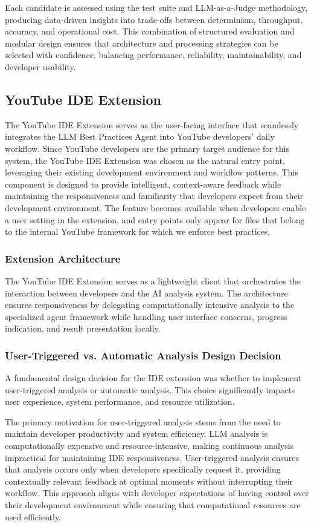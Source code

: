 \begin{spacing}{1.2}
Each candidate is assessed using the test suite and LLM-as-a-Judge methodology, producing data-driven insights into trade-offs between determinism, throughput, accuracy, and operational cost.
This combination of structured evaluation and modular design ensures that architecture and processing strategies can be selected with confidence, balancing performance, reliability, maintainability, and developer usability.


\subsection{YouTube IDE Extension}
The YouTube IDE Extension serves as the user-facing interface that seamlessly integrates the LLM Best Practices Agent into YouTube developers' daily workflow. Since YouTube developers are the primary target audience for this system, the YouTube IDE Extension was chosen as the natural entry point, leveraging their existing development environment and workflow patterns. This component is designed to provide intelligent, context-aware feedback while maintaining the responsiveness and familiarity that developers expect from their development environment. The feature becomes available when developers enable a user setting in the extension, and entry points only appear for files that belong to the internal YouTube framework for which we enforce best practices.

\subsubsection{Extension Architecture}
The YouTube IDE Extension serves as a lightweight client that orchestrates the interaction between developers and the AI analysis system. The architecture ensures responsiveness by delegating computationally intensive analysis to the specialized agent framework while handling user interface concerns, progress indication, and result presentation locally.

\subsubsection{User-Triggered vs. Automatic Analysis Design Decision}
A fundamental design decision for the IDE extension was whether to implement user-triggered analysis or automatic analysis. This choice significantly impacts user experience, system performance, and resource utilization.

The primary motivation for user-triggered analysis stems from the need to maintain developer productivity and system efficiency. LLM analysis is computationally expensive and resource-intensive, making continuous analysis impractical for maintaining IDE responsiveness. User-triggered analysis ensures that analysis occurs only when developers specifically request it, providing contextually relevant feedback at optimal moments without interrupting their workflow. This approach aligns with developer expectations of having control over their development environment while ensuring that computational resources are used efficiently.


\end{spacing}
